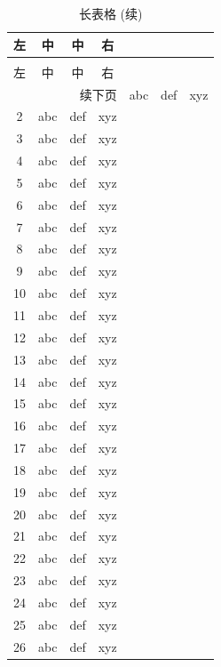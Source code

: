 \begin{center}
  \begin{longtable}{cccc}
    \caption{长表格}\label{tab:longtable}\\ %
    \toprule
    左 & 中 & 中 & 右\\
    \midrule
    \endfirsthead  %
    \caption[]{长表格 (续)}\\ %
    \toprule
    左 & 中 & 中 & 右\\
    \midrule
    \endhead  %
    \hline
    \multicolumn{4}{r}{\small 续下页}
    \endfoot  %
    \bottomrule
    \captionnote{这是个长表格}
    \endlastfoot  %
    1  &  abc  &  def  &  xyz \\
    2  &  abc  &  def  &  xyz \\
    3  &  abc  &  def  &  xyz \\
    4  &  abc  &  def  &  xyz \\
    5  &  abc  &  def  &  xyz \\
    6  &  abc  &  def  &  xyz \\
    7  &  abc  &  def  &  xyz \\
    8  &  abc  &  def  &  xyz \\
    9  &  abc  &  def  &  xyz \\
    10 &  abc  &  def  &  xyz \\
    11 &  abc  &  def  &  xyz \\
    12 &  abc  &  def  &  xyz \\
    13 &  abc  &  def  &  xyz \\
    14 &  abc  &  def  &  xyz \\
    15 &  abc  &  def  &  xyz \\
    16 &  abc  &  def  &  xyz \\
    17 &  abc  &  def  &  xyz \\
    18 &  abc  &  def  &  xyz \\
    19 &  abc  &  def  &  xyz \\
    20 &  abc  &  def  &  xyz \\
    21 &  abc  &  def  &  xyz \\
    22 &  abc  &  def  &  xyz \\
    23 &  abc  &  def  &  xyz \\
    24 &  abc  &  def  &  xyz \\
    25 &  abc  &  def  &  xyz \\
    26 &  abc  &  def  &  xyz \\

\end{longtable}
\end{center}
